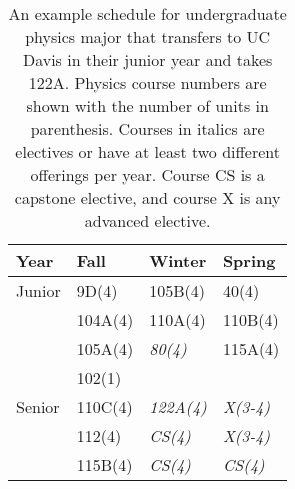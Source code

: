 \documentclass[12pt]{article}
\begin{document}
\begin{table}
\caption{An example schedule for undergraduate physics major that transfers to UC Davis in their junior year and takes 122A.  Physics course numbers are shown with the number of units in parenthesis.  Courses in italics are electives or have at least two different offerings per year.  Course CS is a capstone elective, and course X is any advanced elective.}
\label{tbl:current-transfers}
\begin{center}
\begin{tabular}{|l|l|l|l|}
\hline
Year      & Fall    & Winter & Spring \\
\hline
Junior    & 9D(4)   & 105B(4) & 40(4)   \\
          & 104A(4) & 110A(4) & 110B(4) \\
          & 105A(4) & {\it 80(4)}   & 115A(4) \\
          & 102(1)  &         & \\
\hline
Senior    & 110C(4) & {\it 122A(4)} & {\it X(3-4)}\\
          & 112(4)  & {\it CS(4)}   & {\it X(3-4)}\\
          & 115B(4) & {\it CS(4)}   & {\it CS(4)}\\
\hline 
\end{tabular}
\end{center}
\end{table}
\end{document}
